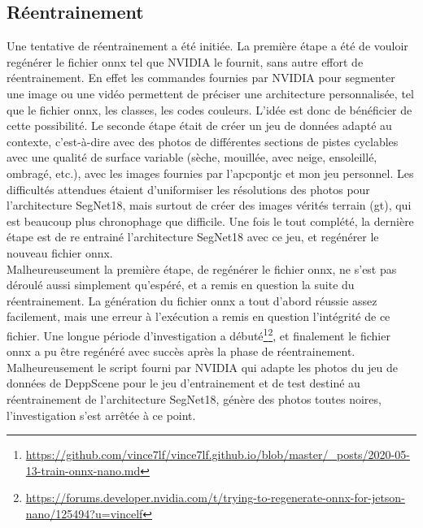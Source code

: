 \subsection{Réentrainement}
\noindent Une tentative de réentrainement a été initiée. La première étape a été de vouloir regénérer le fichier \acrshort{onnx} tel que NVIDIA le fournit, sans autre effort de réentrainement. En effet les commandes fournies par NVIDIA pour segmenter une image ou une vidéo permettent de préciser une architecture personnalisée, tel que le fichier \acrshort{onnx}, les classes, les codes couleurs. L'idée est donc de bénéficier de cette possibilité. Le seconde étape était de créer un jeu de données adapté au contexte, c'est-à-dire avec des photos de différentes sections de pistes cyclables avec une qualité de surface variable (sèche, mouillée, avec neige, ensoleillé, ombragé, etc.), avec les images fournies par l'\acrshort{apcpontjc} et mon jeu personnel. Les difficultés attendues étaient d'uniformiser les résolutions des photos pour l'architecture SegNet18, mais surtout de créer des images vérités terrain (\acrshort{gt}), qui est beaucoup plus chronophage que difficile. Une fois le tout complété, la dernière étape est de re entrainé l'architecture SegNet18 avec ce jeu, et regénérer le nouveau fichier \acrshort{onnx}. 
\vspace{0.5\baselineskip}
\\
\noindent Malheureuseument la première étape, de regénérer le fichier \acrshort{onnx}, ne s'est pas déroulé aussi simplement qu'espéré, et a remis en question la suite du réentrainement. La génération du fichier \acrshort{onnx} a tout d'abord réussie assez facilement, mais une erreur à l'exécution a remis en question l'intégrité de ce fichier. Une longue période d'investigation a débuté\footnote{\url{https://github.com/vince7lf/vince7lf.github.io/blob/master/_posts/2020-05-13-train-onnx-nano.md}}\footnote{\url{https://forums.developer.nvidia.com/t/trying-to-regenerate-onnx-for-jetson-nano/125494?u=vincelf}}, et finalement le fichier \acrshort{onnx} a pu être regénéré avec succès après la phase de réentrainement. Malheureusement le script fourni par NVIDIA qui adapte les photos du jeu de données de DeppScene pour le jeu d'entrainement et de test destiné au réentrainement de l'architecture SegNet18, génère des photos toutes noires, l'investigation s'est arrêtée à ce point.
